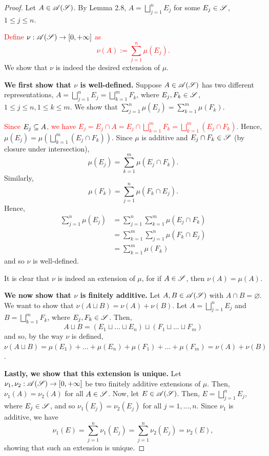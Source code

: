 \begin{proof}
  Let $A \in \mathscr{A}(\mathscr{S})$. By Lemma 2.8, $A = \bigsqcup_{j = 1}^n E_j$ for some $E_j \in \mathscr{S}$, $1 \leq j \leq n$. 

  \textcolor{red}{Define $\nu : \mathscr{A}(\mathscr{S}) \to [0, +\infty]$ as 
  $$ \nu(A) := \sum_{j = 1}^n \mu(E_j). $$
  }
  We show that $\nu$ is indeed the desired extension of $\mu$. 

  \textbf{We first show that $\nu$ is well-defined.} Suppose $A \in \mathscr{A}(\mathscr{S})$ has two different representations, $A = \bigsqcup_{j = 1}^n E_j = \bigsqcup_{k = 1}^m F_k$, where $E_j, F_k \in \mathscr{S}$, $1 \leq j \leq n, 1 \leq k \leq m$. We show that $\sum_{j = 1}^n \mu(E_j) = \sum_{k = 1}^m \mu(F_k)$. 

  \textcolor{red}{Since $E_j \subseteq A$, we have $E_j = E_j \cap A = E_j \cap \bigsqcup_{k = 1}^m F_k = \bigsqcup_{k = 1}^m (E_j \cap F_k)$.} Hence, $\mu(E_j) = \mu \left( \bigsqcup_{k = 1}^m (E_j \cap F_k) \right)$. Since $\mu$ is additive and $E_j \cap F_k \in \mathscr{S}$ (by closure under intersection), 
  $$ \mu(E_j) = \sum_{k = 1}^m \mu(E_j \cap F_k) .$$
  Similarly, 
  $$ \mu(F_k) = \sum_{j = 1}^n \mu(F_k \cap E_j) .$$
  Hence, 
  \begin{align*} 
  \sum_{j = 1}^n \mu(E_j) &= \sum_{j = 1}^n \sum_{k = 1}^m \mu(E_j \cap F_k) \\
  &= \sum_{k = 1}^m \sum_{j = 1}^n \mu(F_k \cap E_j) \\
  &= \sum_{k = 1}^m \mu(F_k)
  \end{align*}
  and so $\nu$ is well-defined.

  It is clear that $\nu$ is indeed an extension of $\mu$, for if $A \in \mathscr{S}$, then $\nu(A) = \mu(A)$. 

  \textbf{We now show that $\nu$ is finitely additive.} Let $A, B \in \mathscr{A}(\mathscr{S})$ with $A \cap B = \varnothing$. We want to show that $\nu(A \sqcup B) = \nu(A) + \nu(B)$. Let $A = \bigsqcup_{j = 1}^n E_j$ and $B = \bigsqcup_{k = 1}^m F_k$, where $E_j, F_k \in \mathscr{S}$. Then, 
  $$ A \sqcup B = (E_1 \sqcup ... \sqcup E_n) \sqcup (F_1 \sqcup ... \sqcup F_m) $$
  and so, by the way $\nu$ is defined, $\nu(A \sqcup B) = \mu(E_1) + ... + \mu(E_n) + \mu(F_1) + ... + \mu(F_m) = \nu(A) + \nu(B)$. 

  \textbf{Lastly, we show that this extension is unique.} Let $\nu_1, \nu_2 : \mathscr{A}(\mathscr{S}) \to [0, + \infty]$ be two finitely additive extensions of $\mu$. Then, $\nu_1(A) = \nu_2(A)$ for all $A \in \mathscr{S}$. Now, let $E \in \mathscr{A}(\mathscr{S})$. Then, $E = \bigsqcup_{j = 1}^n E_j$, where $E_j \in \mathscr{S}$, and so $\nu_1(E_j) = \nu_2(E_j)$ for all $j = 1, ..., n$. Since $\nu_1$ is additive, we have 
  $$ \nu_1(E) = \sum_{j = 1}^n \nu_1(E_j) = \sum_{j = 1}^n \nu_2(E_j) = \nu_2(E), $$
  showing that such an extension is unique. 
\end{proof}

